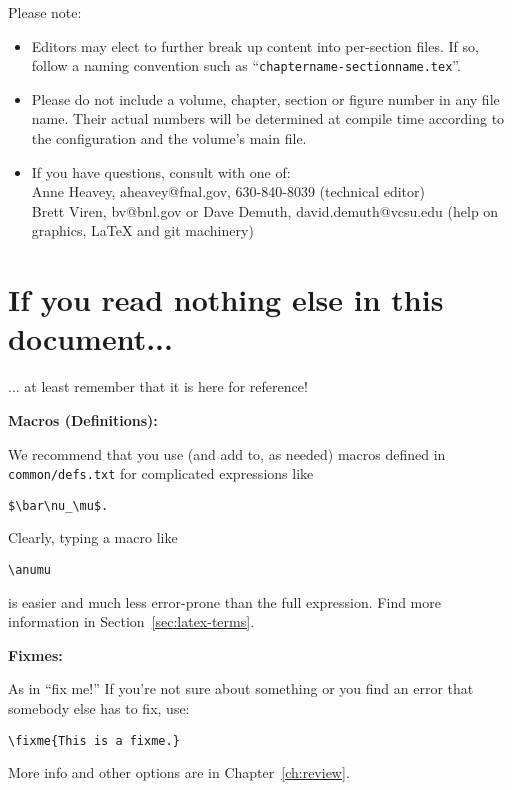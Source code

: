 Please note:
\begin{itemize}
\item Editors may elect to further break up content into per-section files. If so, follow a naming convention such as ``\texttt{chaptername-sectionname.tex}''.
\item Please do not include a volume, chapter, section or figure number in any file name. Their actual numbers will be determined at compile time according to the configuration and the volume's main file. 
\item If you have questions, consult with one of: \\
  Anne Heavey, aheavey@fnal.gov, 630-840-8039 (technical editor)\\
  Brett Viren, bv@bnl.gov or Dave Demuth, david.demuth@vcsu.edu (help on graphics, \LaTeX{} and git machinery)
\end{itemize}

\section{If you read nothing else in this document...}
\label{sec:gen-nothing}

... at least remember that it is here for reference!

\textbf{Macros (Definitions):}

\begin{framed}
We recommend that you use (and add to, as needed) macros defined in \texttt{common/defs.txt} for complicated expressions like 
\begin{verbatim}
$\bar\nu_\mu$.
\end{verbatim}
 Clearly, typing a macro like 
 \begin{verbatim}
\anumu
\end{verbatim} 
is easier and much less error-prone than the full expression.
Find more information in Section~\ref{sec:latex-terms}.
\end{framed}

\textbf{Fixmes:}

\begin{framed}
As in ``fix me!'' If you're not sure about something or you find an error that somebody else has to fix, use:
\begin{verbatim}
\fixme{This is a fixme.}
\end{verbatim}
More info and other options are in Chapter~\ref{ch:review}.
\end{framed}

